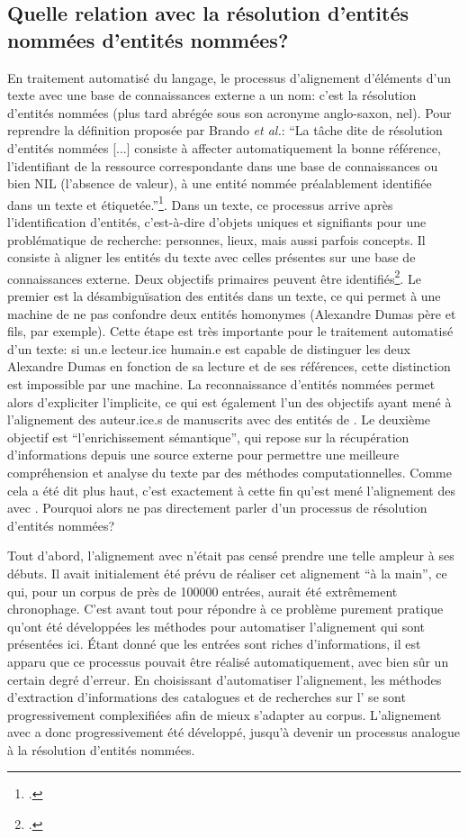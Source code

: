 \subsection{Quelle relation avec la résolution d'entités nommées d'entités nommées?}
En traitement automatisé du langage, le processus d'alignement d'éléments d'un texte avec une base de connaissances externe a un nom: c'est la résolution d'entités nommées (plus tard abrégée sous son acronyme anglo-saxon, \gls{nel}). Pour reprendre la définition proposée par Brando \textit{et al.}: \enquote{La tâche dite de résolution d’entités nommées [...] consiste à affecter automatiquement la bonne référence, l’identifiant de la ressource correspondante dans une base de connaissances ou bien NIL (l’absence de valeur), à une entité nommée préalablement identifiée dans un texte et étiquetée.}\footcite[p. 31]{brando_evaluation_2016}. Dans un texte, ce processus arrive après l'identification d'entités, c'est-à-dire d'objets uniques et signifiants pour une problématique de recherche: personnes, lieux, mais aussi parfois concepts. Il consiste à aligner les entités du texte avec celles présentes sur une base de connaissances externe. Deux objectifs primaires peuvent être identifiés\footcite[p. 32]{brando_evaluation_2016}. Le premier est la désambiguïsation des entités dans un texte, ce qui permet à une machine de ne pas confondre deux entités homonymes (Alexandre Dumas père et fils, par exemple). Cette étape est très importante pour le traitement automatisé d'un texte: si un.e lecteur.ice humain.e est capable de distinguer les deux Alexandre Dumas en fonction de sa lecture et de ses références, cette distinction est impossible par une machine. La reconnaissance d'entités nommées permet alors d'expliciter l'implicite, ce qui est également l'un des objectifs ayant mené à l'alignement des auteur.ice.s de manuscrits avec des entités de \wkd{}. Le deuxième objectif est \enquote{l'enrichissement sémantique}, qui repose sur la récupération d'informations depuis une source externe pour permettre une meilleure compréhension et analyse du texte par des méthodes computationnelles. Comme cela a été dit plus haut, c'est exactement à cette fin qu'est mené l'alignement des \tname{} avec \wkd{}. Pourquoi alors ne pas directement parler d'un processus de résolution d'entités nommées?

Tout d'abord, l'alignement avec \wkd{} n'était pas censé prendre une telle ampleur à ses débuts. Il avait initialement été prévu de réaliser cet alignement \enquote{à la main}, ce qui, pour un corpus de près de 100000 entrées, aurait été extrêmement chronophage. C'est avant tout pour répondre à ce problème purement pratique qu'ont été développées les méthodes pour automatiser l'alignement qui sont présentées ici. Étant donné que les entrées sont riches d'informations, il est apparu que ce processus pouvait être réalisé automatiquement, avec bien sûr un certain degré d'erreur. En choisissant d'automatiser l'alignement, les méthodes d'extraction d'informations des catalogues et de recherches sur l'\api{} se sont progressivement complexifiées afin de mieux s'adapter au corpus. L'alignement avec \wkd{} a donc progressivement été développé, jusqu'à devenir un processus analogue à la résolution d'entités nommées.

